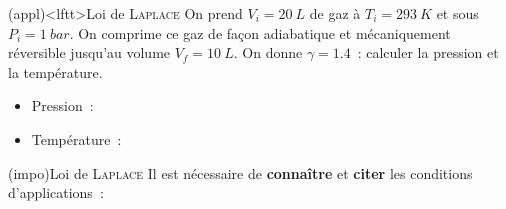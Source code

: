 \documentclass[../../main/main.tex]{subfiles}
\begin{document}
\begin{tcb}(appl)<lftt>{Loi de \textsc{Laplace}}
	On prend $V_i = \SI{20}{L}$ de gaz à $T_i = \SI{293}{K}$ et sous $P_i =
		\SI{1}{bar}$. On comprime ce gaz de façon adiabatique et mécaniquement
	réversible jusqu'au volume $V_f = \SI{10}{L}$. On donne $\gamma = \num{1.4}$~:
	calculer la pression et la température.
	\tcblower
	\begin{isd}
		\begin{itemize}
			\item Pression~:
		\end{itemize}
		\tcblower
		\begin{itemize}
			\item Température~:
		\end{itemize}
	\end{isd}
\end{tcb}

\begin{tcb*}(impo){Loi de \textsc{Laplace}}
	Il est nécessaire de \textbf{connaître} et \textbf{citer} les
	conditions d'applications~:
	\begin{tasks}[label=\bdmd]
		\task {}
		\task {}
		\task {}
	\end{tasks}
\end{tcb*}

\end{document}
